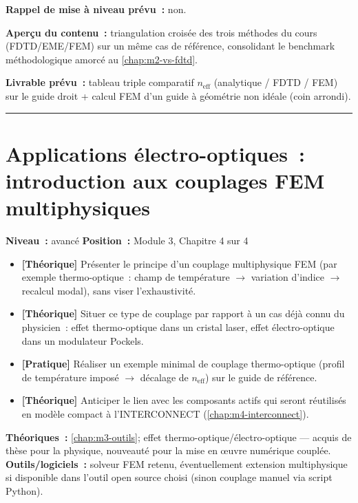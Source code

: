 \noindent\textbf{Rappel de mise à niveau prévu~:} non.

\noindent\textbf{Aperçu du contenu~:} triangulation croisée des trois méthodes du cours (FDTD/EME/FEM) sur un même cas de référence, consolidant le benchmark méthodologique amorcé au \cref{chap:m2-vs-fdtd}.

\noindent\textbf{Livrable prévu~:} tableau triple comparatif $n_{\text{eff}}$ (analytique / FDTD / FEM) sur le guide droit + calcul FEM d'un guide à géométrie non idéale (coin arrondi).

\bigskip\hrule\bigskip

\chapter{Applications électro-optiques~: introduction aux couplages FEM multiphysiques}
\label{chap:m3-multiphysique}

\noindent\textbf{Niveau~:} avancé \hfill \textbf{Position~:} Module 3, Chapitre 4 sur 4

\begin{objectifs}
\begin{itemize}[leftmargin=1.4em]
  \item \textbf{[Théorique]} Présenter le principe d'un couplage multiphysique FEM (par exemple thermo-optique~: champ de température $\to$ variation d'indice $\to$ recalcul modal), sans viser l'exhaustivité.
  \item \textbf{[Théorique]} Situer ce type de couplage par rapport à un cas déjà connu du physicien~: effet thermo-optique dans un cristal laser, effet électro-optique dans un modulateur Pockels.
  \item \textbf{[Pratique]} Réaliser un exemple minimal de couplage thermo-optique (profil de température imposé $\to$ décalage de $n_{\text{eff}}$) sur le guide de référence.
  \item \textbf{[Théorique]} Anticiper le lien avec les composants actifs qui seront réutilisés en modèle compact à l'INTERCONNECT (\cref{chap:m4-interconnect}).
\end{itemize}
\end{objectifs}

\begin{prerequis}
\textbf{Théoriques~:} \cref{chap:m3-outils}; effet thermo-optique/électro-optique — acquis de thèse pour la physique, nouveauté pour la mise en œuvre numérique couplée.\\
\textbf{Outils/logiciels~:} solveur FEM retenu, éventuellement extension multiphysique si disponible dans l'outil open source choisi (sinon couplage manuel via script Python).
\end{prerequis}

